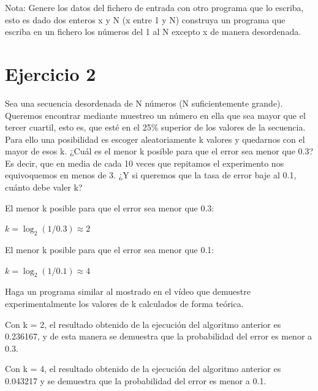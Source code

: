 \documentclass{uimppracticas}
\begin{document}
Nota: Genere los datos del fichero de entrada con otro programa que lo escriba, esto es dado dos enteros x y N (x entre 1 y N) construya un programa que escriba en un fichero los números del 1 al N excepto x de manera desordenada.



\section{Ejercicio 2}

Sea una secuencia desordenada de N números (N suficientemente grande). Queremos encontrar mediante muestreo un número en ella que sea mayor que el tercer cuartil, esto es, que esté en el 25\% superior de los valores de la secuencia. Para ello una posibilidad es escoger aleatoriamente k valores y quedarnos con el mayor de esos k. ¿Cuál es el menor k posible para que el error sea menor que 0.3? Es decir, que en media de cada 10 veces que repitamos el experimento nos equivoquemos en menos de 3. ¿Y si queremos que la tasa de error baje al 0.1, cuánto debe valer k? 

El menor k posible para que el error sea menor que 0.3:

\begin{center}
	$ k = \log_2(1/0.3) \approx 2 $
\end{center}

El menor k posible para que el error sea menor que 0.1:

\begin{center}
	$ k = \log_2(1/0.1) \approx 4 $
\end{center}

Haga un programa similar al mostrado en el vídeo que demuestre experimentalmente los valores de k calculados de forma teórica.



\newpage

Con k = 2, el resultado obtenido de la ejecución del algoritmo anterior es 0.236167, y de esta manera se demuestra que la probabilidad del error es menor a 0.3.

Con k = 4, el resultado obtenido de la ejecución del algoritmo anterior es 0.043217 y se demuestra que la probabilidad del error es menor a 0.1.
\end{document}
